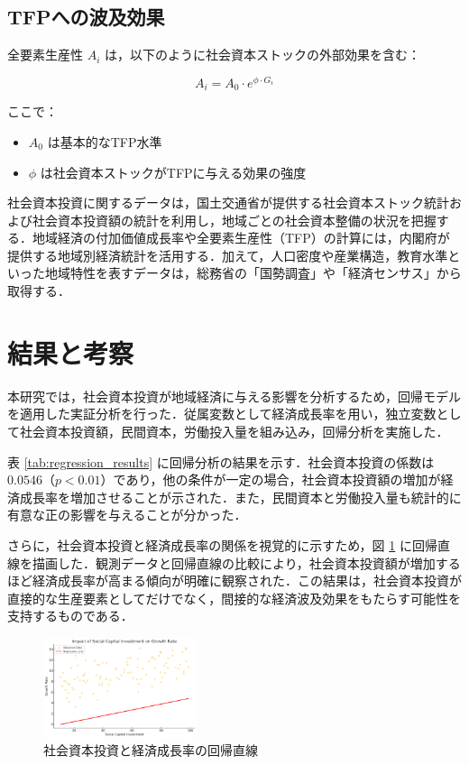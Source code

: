 \documentclass[a4paper, 10.5pt, twocolumn, dvipdfmx]{jarticle}
\begin{document}
\subsection{TFPへの波及効果}

全要素生産性 \( A_i \) は，以下のように社会資本ストックの外部効果を含む：

\[
	A_i = A_0 \cdot e^{\phi \cdot G_i}
\]

ここで：
\begin{itemize}
	\renewcommand{\labelitemi}{}
	\item \( A_0 \) は基本的なTFP水準
	\item \( \phi \) は社会資本ストックがTFPに与える効果の強度
\end{itemize}

社会資本投資に関するデータは，国土交通省が提供する社会資本ストック統計および社会資本投資額の統計を利用し，地域ごとの社会資本整備の状況を把握する．地域経済の付加価値成長率や全要素生産性（TFP）の計算には，内閣府が提供する地域別経済統計を活用する．加えて，人口密度や産業構造，教育水準といった地域特性を表すデータは，総務省の「国勢調査」や「経済センサス」から取得する．

\section{結果と考察}
本研究では，社会資本投資が地域経済に与える影響を分析するため，回帰モデルを適用した実証分析を行った．従属変数として経済成長率を用い，独立変数として社会資本投資額，民間資本，労働投入量を組み込み，回帰分析を実施した．

表 \ref{tab:regression_results} に回帰分析の結果を示す．社会資本投資の係数は \( 0.0546 \)（\( p < 0.01 \)）であり，他の条件が一定の場合，社会資本投資額の増加が経済成長率を増加させることが示された．また，民間資本と労働投入量も統計的に有意な正の影響を与えることが分かった．

さらに，社会資本投資と経済成長率の関係を視覚的に示すため，図 \ref{fig:regression_plot} に回帰直線を描画した．観測データと回帰直線の比較により，社会資本投資額が増加するほど経済成長率が高まる傾向が明確に観察された．この結果は，社会資本投資が直接的な生産要素としてだけでなく，間接的な経済波及効果をもたらす可能性を支持するものである．



\begin{figure}[!ht]
	\centering
	\includegraphics[width=0.4\textwidth]{figure/figure_sample.png}
	\caption{社会資本投資と経済成長率の回帰直線}
	\label{fig:regression_plot}
\end{figure}
\end{document}
